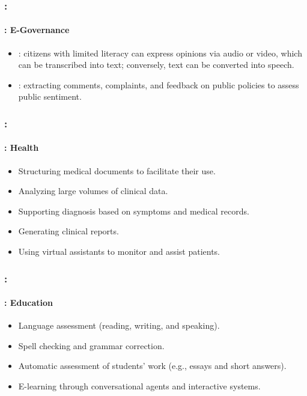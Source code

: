 \documentclass[xcolor=table]{beamer}
\begin{document}
\begin{frame}
	\frametitle{\insertshortsubtitle: \insertsection}
	\framesubtitle{\insertsubsection: E-Governance}

	\begin{itemize}
		\item {}: citizens with limited literacy can express opinions via audio or video, which can be transcribed into text; conversely, text can be converted into speech.
		
		\item {}: extracting comments, complaints, and feedback on public policies to assess public sentiment.
	\end{itemize}

\end{frame}

\begin{frame}
	\frametitle{\insertshortsubtitle: \insertsection}
	\framesubtitle{\insertsubsection: Health}

	\begin{itemize}
		\item Structuring medical documents to facilitate their use.
		\item Analyzing large volumes of clinical data.
		\item Supporting diagnosis based on symptoms and medical records.
		\item Generating clinical reports.
		\item Using virtual assistants to monitor and assist patients.
	\end{itemize}

\end{frame}

\begin{frame}
	\frametitle{\insertshortsubtitle: \insertsection}
	\framesubtitle{\insertsubsection: Education}

	\begin{itemize}
		\item Language assessment (reading, writing, and speaking).
		\item Spell checking and grammar correction.
		\item Automatic assessment of students' work (e.g., essays and short answers).
		\item E-learning through conversational agents and interactive systems.
	\end{itemize}

\end{frame}
\end{document}
